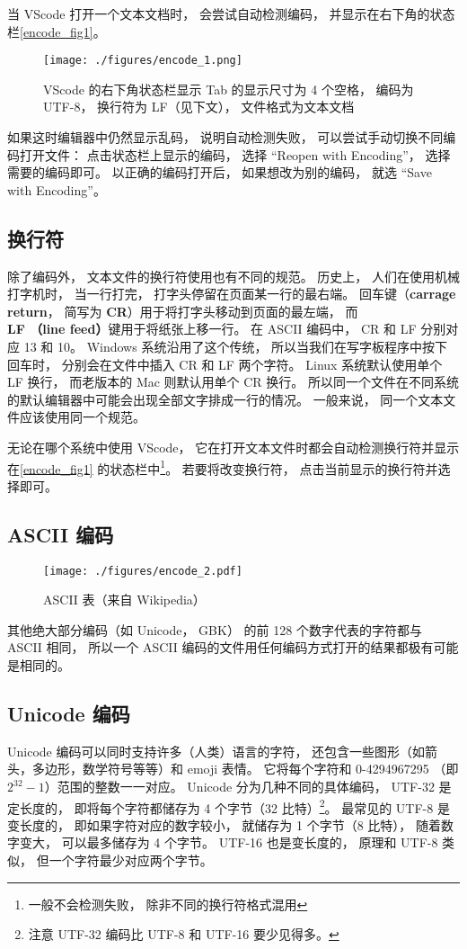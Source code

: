 当 VScode 打开一个文本文档时， 会尝试自动检测编码， 并显示在右下角的状态栏\autoref{encode_fig1}。
\begin{figure}[ht]
\centering
\texttt{[image: ./figures/encode\_1.png]}
\caption{VScode 的右下角状态栏显示 Tab 的显示尺寸为 4 个空格， 编码为 UTF-8， 换行符为 LF（见下文）， 文件格式为文本文档} \label{encode_fig1}
\end{figure}
如果这时编辑器中仍然显示乱码， 说明自动检测失败， 可以尝试手动切换不同编码打开文件： 点击状态栏上显示的编码， 选择 “Reopen with Encoding”， 选择需要的编码即可。 以正确的编码打开后， 如果想改为别的编码， 就选 “Save with Encoding”。

\subsection{换行符}\label{encode_sub1}
除了编码外， 文本文件的换行符使用也有不同的规范。 历史上， 人们在使用机械打字机时， 当一行打完， 打字头停留在页面某一行的最右端。 回车键（\textbf{carrage return}， 简写为 \textbf{CR}）用于将打字头移动到页面的最左端， 而 \textbf{LF （line feed）}键用于将纸张上移一行。 在 ASCII 编码中， CR 和 LF 分别对应 13 和 10。 Windows 系统沿用了这个传统， 所以当我们在写字板程序中按下回车时， 分别会在文件中插入 CR 和 LF 两个字符。 Linux 系统默认使用单个 LF 换行， 而老版本的 Mac 则默认用单个 CR 换行。 所以同一个文件在不同系统的默认编辑器中可能会出现全部文字排成一行的情况。 一般来说， 同一个文本文件应该使用同一个规范。

无论在哪个系统中使用 VScode， 它在打开文本文件时都会自动检测换行符并显示在\autoref{encode_fig1} 的状态栏中\footnote{一般不会检测失败， 除非不同的换行符格式混用}。 若要将改变换行符， 点击当前显示的换行符并选择即可。

\subsection{ASCII 编码}
\begin{figure}[ht]
\centering
\texttt{[image: ./figures/encode\_2.pdf]}
\caption{ASCII 表（来自 Wikipedia）} \label{encode_fig2}
\end{figure}


其他绝大部分编码（如 Unicode， GBK） 的前 128 个数字代表的字符都与 ASCII 相同， 所以一个 ASCII 编码的文件用任何编码方式打开的结果都极有可能是相同的。

\subsection{Unicode 编码}
Unicode 编码可以同时支持许多（人类）语言的字符， 还包含一些图形（如箭头，多边形，数学符号等等）和 emoji 表情。 它将每个字符和 0-4294967295 （即 $2^{32}-1$）范围的整数一一对应。 Unicode 分为几种不同的具体编码， UTF-32 是定长度的， 即将每个字符都储存为 4 个字节（32 比特）\footnote{注意 UTF-32 编码比 UTF-8 和 UTF-16 要少见得多。}。 最常见的 UTF-8 是变长度的， 即如果字符对应的数字较小， 就储存为 1 个字节（8 比特）， 随着数字变大， 可以最多储存为 4 个字节。 UTF-16 也是变长度的， 原理和 UTF-8 类似， 但一个字符最少对应两个字节。

